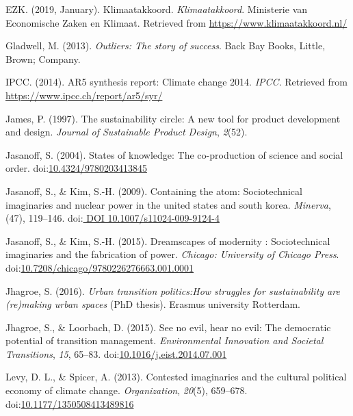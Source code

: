 \documentclass[man,floatsintext]{apa6}
\begin{document}
\hypertarget{ref-klimaat_2019}{}
EZK. (2019, January). Klimaatakkoord. \emph{Klimaatakkoord}. Ministerie
van Economische Zaken en Klimaat. Retrieved from
\url{https://www.klimaatakkoord.nl/}

\hypertarget{ref-gladwell_2013}{}
Gladwell, M. (2013). \emph{Outliers: The story of success}. Back Bay
Books, Little, Brown; Company.

\hypertarget{ref-ipcc_2014}{}
IPCC. (2014). AR5 synthesis report: Climate change 2014. \emph{IPCC}.
Retrieved from \url{https://www.ipcc.ch/report/ar5/syr/}

\hypertarget{ref-James_1997}{}
James, P. (1997). The sustainability circle: A new tool for product
development and design. \emph{Journal of Sustainable Product Design},
\emph{2}(52).

\hypertarget{ref-jasanoff_2004}{}
Jasanoff, S. (2004). States of knowledge: The co-production of science
and social order.
doi:\href{https://doi.org/10.4324/9780203413845}{10.4324/9780203413845}

\hypertarget{ref-Jasanoff_kim_2009}{}
Jasanoff, S., \& Kim, S.-H. (2009). Containing the atom: Sociotechnical
imaginaries and nuclear power in the united states and south korea.
\emph{Minerva}, (47), 119--146.
doi:\href{https://doi.org/\%20DOI\%2010.1007/s11024-009-9124-4}{ DOI 10.1007/s11024-009-9124-4}

\hypertarget{ref-jasanoff_kim_2015}{}
Jasanoff, S., \& Kim, S.-H. (2015). Dreamscapes of modernity :
Sociotechnical imaginaries and the fabrication of power. \emph{Chicago:
University of Chicago Press}.
doi:\href{https://doi.org/10.7208/chicago/9780226276663.001.0001}{10.7208/chicago/9780226276663.001.0001}

\hypertarget{ref-Jhagroe_2016}{}
Jhagroe, S. (2016). \emph{Urban transition politics:How struggles for
sustainability are (re)making urban spaces} (PhD thesis). Erasmus
university Rotterdam.

\hypertarget{ref-jhagroe_2015}{}
Jhagroe, S., \& Loorbach, D. (2015). See no evil, hear no evil: The
democratic potential of transition management. \emph{Environmental
Innovation and Societal Transitions}, \emph{15}, 65--83.
doi:\href{https://doi.org/10.1016/j.eist.2014.07.001}{10.1016/j.eist.2014.07.001}

\hypertarget{ref-levy_spicer_2013}{}
Levy, D. L., \& Spicer, A. (2013). Contested imaginaries and the
cultural political economy of climate change. \emph{Organization},
\emph{20}(5), 659--678.
doi:\href{https://doi.org/10.1177/1350508413489816}{10.1177/1350508413489816}
\end{document}
